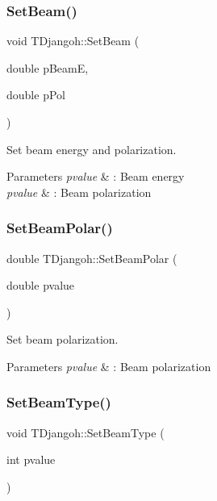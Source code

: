 \subsubsection{\texorpdfstring{Set\+Beam()}{SetBeam()}}
{\footnotesize\ttfamily void T\+Djangoh\+::\+Set\+Beam (\begin{DoxyParamCaption}\item[{double}]{p\+BeamE,  }\item[{double}]{p\+Pol }\end{DoxyParamCaption})}



Set beam energy and polarization. 


\begin{DoxyParams}{Parameters}
{\em pvalue} & \+: Beam energy \\
\hline
{\em pvalue} & \+: Beam polarization \\
\hline
\end{DoxyParams}
\mbox{\label{class_t_djangoh_a34a0415a20f61670164665904eeca25b}} 
\subsubsection{\texorpdfstring{Set\+Beam\+Polar()}{SetBeamPolar()}}
{\footnotesize\ttfamily double T\+Djangoh\+::\+Set\+Beam\+Polar (\begin{DoxyParamCaption}\item[{double}]{pvalue }\end{DoxyParamCaption})}



Set beam polarization. 


\begin{DoxyParams}{Parameters}
{\em pvalue} & \+: Beam polarization \\
\hline
\end{DoxyParams}
\mbox{\label{class_t_djangoh_af93ae6412c07af22bca887cbcbba5082}} 
\subsubsection{\texorpdfstring{Set\+Beam\+Type()}{SetBeamType()}\hspace{0.1cm}{\footnotesize\ttfamily [1/2]}}
{\footnotesize\ttfamily void T\+Djangoh\+::\+Set\+Beam\+Type (\begin{DoxyParamCaption}\item[{int}]{pvalue }\end{DoxyParamCaption})}



